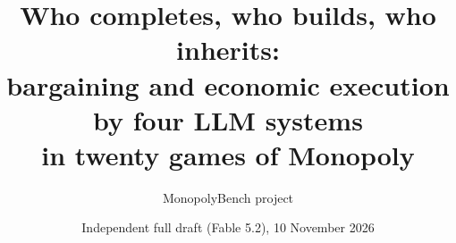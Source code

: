 \documentclass[11pt,letterpaper]{article}
\title{Who completes, who builds, who inherits:\\ bargaining and economic execution by four LLM systems\\ in twenty games of Monopoly}
\author{MonopolyBench project}
\date{Independent full draft (Fable 5.2), 10 November 2026}
\begin{document}


\maketitle
\begin{abstract}

\end{abstract}











\begingroup
\small


\endgroup
\clearpage
\appendix






\end{document}
